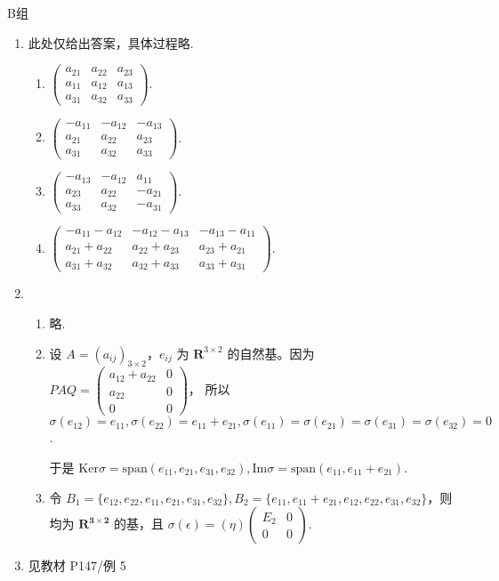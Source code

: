\centerline{\heiti B组}
\begin{enumerate}
    \item 此处仅给出答案，具体过程略.
    \begin{enumerate}
        \item $\begin{pmatrix}a_{21} & a_{22} & a_{23} \\ a_{11} & a_{12} & a_{13} \\ a_{31} & a_{32} & a_{33}\end{pmatrix}$.
        \item $\begin{pmatrix}-a_{11} & -a_{12} & -a_{13} \\ a_{21} & a_{22} & a_{23} \\ a_{31} & a_{32} & a_{33}\end{pmatrix}$.
        \item $\begin{pmatrix}-a_{13} & -a_{12} & a_{11} \\ a_{23} & a_{22} & -a_{21} \\ a_{33} & a_{32} & -a_{31}\end{pmatrix}$.
        \item $\begin{pmatrix}-a_{11}-a_{12} & -a_{12}-a_{13} & -a_{13}-a_{11} \\ a_{21}+a_{22} & a_{22}+a_{23} & a_{23}+a_{21} \\ a_{31}+a_{32} & a_{32}+a_{33} & a_{33}+a_{31}\end{pmatrix}$.
    \end{enumerate}
    \item \begin{enumerate}
        \item 略.
        \item 设 $A=(a_{ij})_{3\times 2}$，$e_{ij}$ 为 $\mathbf{R}^{3\times 2}$ 的自然基。因为 $PAQ = \begin{pmatrix}a_{12}+a_{22} & 0 \\ a_{22} & 0 \\ 0 & 0\end{pmatrix}$，
        所以 $\sigma(e_{12}) = e_{11},\sigma(e_{22}) = e_{11}+e_{21},\sigma(e_{11})=\sigma(e_{21})=\sigma(e_{31})=\sigma(e_{32})=0$.
        
        于是 $\mathrm{Ker}\sigma = \mathrm{span}(e_{11},e_{21},e_{31},e_{32}),\mathrm{Im}\sigma = \mathrm{span}(e_{11},e_{11}+e_{21})$. 
        \item 令 $B_1=\{e_{12},e_{22},e_{11},e_{21},e_{31},e_{32}\},B_2=\{e_{11},e_{11}+e_{21},e_{12},e_{22},e_{31},e_{32}\}$，则均为 $\mathbf{R^{3\times 2}}$ 的基，且 $\sigma(\epsilon)=(\eta)\begin{pmatrix}E_2 & 0 \\ 0 & 0\end{pmatrix}$.
    \end{enumerate}
    \item 见教材 P147/例 5
\end{enumerate}

